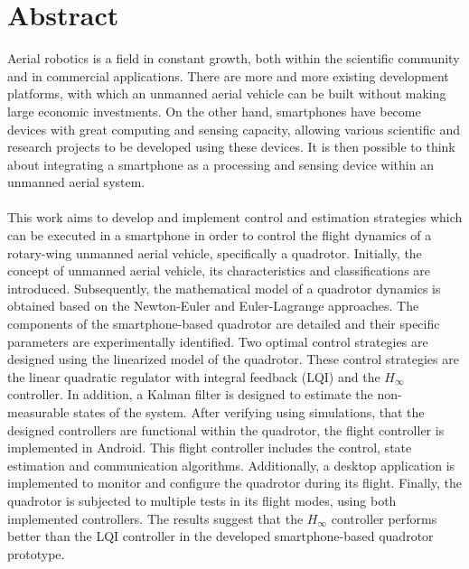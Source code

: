 \chapter*{Abstract} \label{abstract}
\setcounter{page}{5} 
Aerial robotics is a field in constant growth, both within the scientific community and in commercial applications. There are more and more existing development platforms, with which an unmanned aerial vehicle can be built without making large economic investments. On the other hand, smartphones have become devices with great computing and sensing capacity, allowing various scientific and research projects to be developed using these devices. It is then possible to think about integrating a smartphone as a processing and sensing device within an unmanned aerial system.
\\\\
This work aims to develop and implement control and estimation strategies which can be executed in a smartphone in order to control the flight dynamics of a rotary-wing unmanned aerial vehicle, specifically a quadrotor. Initially, the concept of unmanned aerial vehicle, its characteristics and classifications are introduced. Subsequently, the mathematical model of a quadrotor dynamics is obtained based on the Newton-Euler and Euler-Lagrange approaches. The components of the smartphone-based quadrotor are detailed and their specific parameters are experimentally identified. Two optimal control strategies are designed using the linearized model of the quadrotor. These control strategies are the linear quadratic regulator with integral feedback (LQI) and the $H_\infty$ controller. In addition, a Kalman filter is designed to estimate the non-measurable states of the system. After verifying using simulations, that the designed controllers are functional within the quadrotor, the flight controller is implemented in Android. This flight controller includes the control, state estimation and communication algorithms. Additionally, a desktop application is implemented to monitor and configure the quadrotor during its flight. Finally, the quadrotor is subjected to multiple tests in its flight modes, using both implemented controllers. The results suggest that the $H_\infty$ controller performs better than the LQI controller in the developed smartphone-based quadrotor prototype.
\\\\

